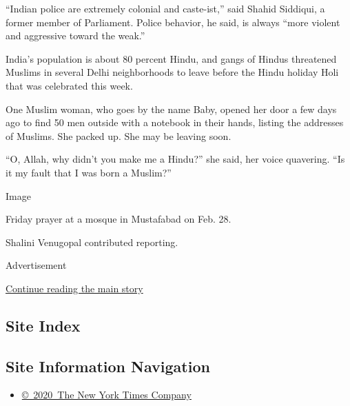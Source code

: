 ``Indian police are extremely colonial and caste-ist,'' said Shahid
Siddiqui, a former member of Parliament. Police behavior, he said, is
always ``more violent and aggressive toward the weak.''

India's population is about 80 percent Hindu, and gangs of Hindus
threatened Muslims in several Delhi neighborhoods to leave before the
Hindu holiday Holi that was celebrated this week.

One Muslim woman, who goes by the name Baby, opened her door a few days
ago to find 50 men outside with a notebook in their hands, listing the
addresses of Muslims. She packed up. She may be leaving soon.

``O, Allah, why didn't you make me a Hindu?'' she said, her voice
quavering. ``Is it my fault that I was born a Muslim?''

Image

Friday prayer at a mosque in Mustafabad on Feb. 28.~

Shalini Venugopal contributed reporting.

Advertisement

\protect\hyperlink{after-bottom}{Continue reading the main story}

\hypertarget{site-index}{%
\subsection{Site Index}\label{site-index}}

\hypertarget{site-information-navigation}{%
\subsection{Site Information
Navigation}\label{site-information-navigation}}

\begin{itemize}
\tightlist
\item
  \href{https://help.nytimes.com/hc/en-us/articles/115014792127-Copyright-notice}{©~2020~The
  New York Times Company}
\end{itemize}

